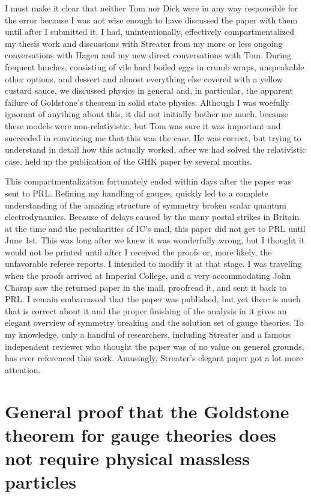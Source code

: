 \documentclass[12pt]{article}
\begin{document}
    I must make it clear that neither Tom nor Dick were in any way
    responsible for the error because I was not wise enough to have
    discussed the paper with them until after I submitted it. I had,
    unintentionally, effectively compartmentalized my thesis work and
    discussions with Streater from my more or less ongoing
    conversations with Hagen and my new direct conversations with Tom.
    During frequent lunches, consisting of vile hard boiled eggs in
    crumb wraps, unspeakable other options, and dessert and almost
    everything else covered with a yellow custard sauce, we discussed
    physics in general and, in particular, the apparent failure of
    Goldstone's theorem in solid state physics. Although I was
    woefully ignorant of anything about this, it did not initially
    bother me much, because these models were non-relativistic, but
    Tom was sure it was important and succeeded in convincing me that
    this was the case.  He was correct, but trying to understand in
    detail how this actually worked, after we had solved the
    relativistic case, held up the publication of the GHK paper by
    several months.

    This compartmentalization fortunately ended within days after the paper
    \cite{ggfu;1964} was sent to PRL. Refining my handling of gauges, quickly
    led to a complete understanding of the amazing structure of symmetry
    broken scalar quantum electrodynamics. Because of delays caused by the
    many postal strikes in Britain at the time and the peculiarities of IC's
    mail, this paper did not get to PRL until June 1st. This was long after we
    knew it was wonderfully wrong, but I thought it would not be printed until
    after I received the proofs or, more likely, the unfavorable referee
    reports. I intended to modify it at that stage. I was traveling when the
    proofs arrived at Imperial College, and a very accommodating John Charap
    saw the returned paper in the mail, proofread it, and sent it back to
    PRL. I remain embarrassed that the paper was published, but yet there is
    much that is correct about it and the proper finishing of the analysis in
    it gives an elegant overview of symmetry breaking and the solution set of
    gauge theories. To my knowledge, only a handful of researchers, including
    Streater and a famous independent reviewer who thought the paper was of no
    value on general grounds, has ever referenced this work. Amusingly,
    Streater's elegant paper got a lot more attention.


    \section{General proof that the Goldstone theorem for gauge theories
      does not require physical massless particles} \label{sec:5}
\end{document}
